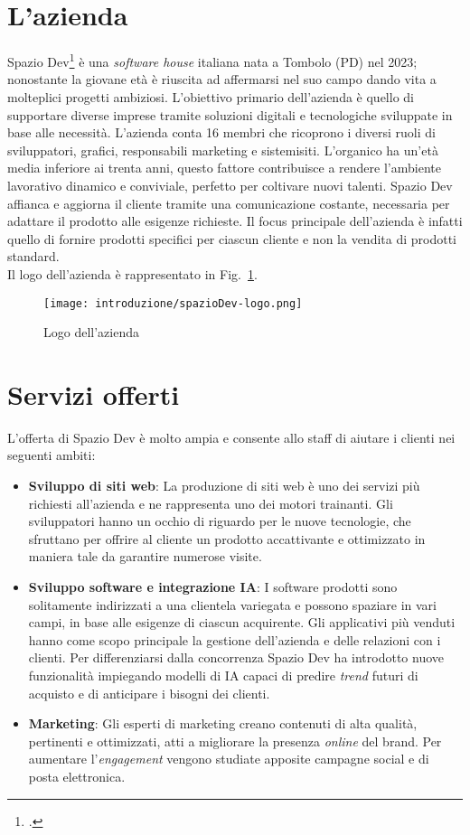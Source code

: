 \section{L'azienda}
Spazio Dev\footcite{site:spaziodev} è una \emph{software house} italiana nata a Tombolo (PD) nel 2023; nonostante la giovane età è riuscita ad affermarsi nel suo campo dando vita a molteplici progetti ambiziosi. L'obiettivo primario dell'azienda è quello di supportare diverse imprese tramite soluzioni digitali e tecnologiche sviluppate in base alle necessità.
L'azienda conta 16 membri che ricoprono i diversi ruoli di sviluppatori, grafici, responsabili marketing e sistemisiti. L'organico ha un'età media inferiore ai trenta anni, questo fattore contribuisce a rendere l'ambiente lavorativo dinamico e conviviale, perfetto per coltivare nuovi talenti.
Spazio Dev affianca e aggiorna il cliente tramite una comunicazione costante, necessaria per adattare il prodotto alle esigenze richieste. Il focus principale dell'azienda è infatti quello di fornire prodotti specifici per ciascun cliente e non la vendita di prodotti standard.\\
Il logo dell'azienda è rappresentato in Fig.~\ref{fig:logo-spaziodev}.

\begin{figure}[!h] 
  \centering 
  \texttt{[image: introduzione/spazioDev-logo.png]} 
  \caption{Logo dell'azienda}
  \label{fig:logo-spaziodev}
\end{figure}



\section{Servizi offerti}
L'offerta di Spazio Dev è molto ampia e consente allo staff di aiutare i clienti nei seguenti ambiti:
\begin{itemize}
  \item \textbf{Sviluppo di siti web}: La produzione di siti web è uno dei servizi più richiesti all'azienda e ne rappresenta uno dei motori trainanti. Gli sviluppatori hanno un occhio di riguardo per le nuove tecnologie, che sfruttano per offrire al cliente un prodotto accattivante e ottimizzato in maniera tale da garantire numerose visite.
  \item \textbf{Sviluppo software e integrazione IA}: I software prodotti sono solitamente indirizzati a una clientela variegata e possono spaziare in vari campi, in base alle esigenze di ciascun acquirente. Gli applicativi più venduti hanno come scopo principale la gestione dell'azienda e delle relazioni con i clienti. Per differenziarsi dalla concorrenza Spazio Dev ha introdotto nuove funzionalità impiegando modelli di IA capaci di predire \emph{trend} futuri di acquisto e  di anticipare i bisogni dei clienti.
  \item \textbf{Marketing}: Gli esperti di marketing creano contenuti di alta qualità, pertinenti e ottimizzati, atti a migliorare la presenza \emph{online} del brand. Per aumentare l'\emph{engagement} vengono studiate apposite campagne social e di posta elettronica.
\end{itemize}

